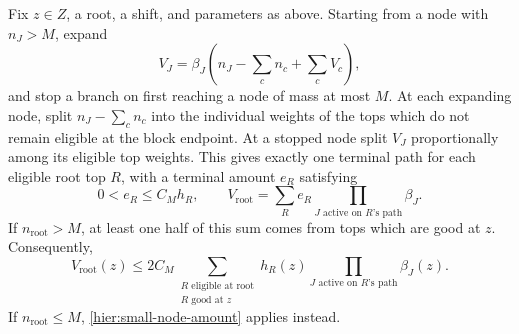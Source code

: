 \begin{lemma}
\label{hier:path-expansion}
Fix $z\in Z$, a root, a shift, and parameters as above.  Starting
from a node with $n_J>M$, expand
\begin{equation}
 V_J=\beta_J
      \left(n_J-\sum_c n_c+\sum_c V_c\right),
 \label{hier:exact-expansion}
\end{equation}
and stop a branch on first reaching a node of mass at most $M$.
At each expanding node, split $n_J-\sum_c n_c$ into the individual
weights of the tops which do not remain eligible at the block endpoint.
At a stopped node split $V_J$ proportionally among its eligible top
weights.  This gives exactly one terminal path for each eligible root
top $R$, with a terminal amount $e_R$ satisfying
\begin{equation}
 0<e_R\le C_Mh_R,
 \qquad
 V_{\mathrm{root}}
 =\sum_R e_R\prod_{J\text{ active on }R\text{'s path}}\beta_J.
 \label{hier:top-path-expansion}
\end{equation}
If $n_{\mathrm{root}}>M$, at least one half of this sum comes from tops
which are good at $z$.  Consequently,
\begin{equation}
 V_{\mathrm{root}}(z)
 \le 2C_M\sum_{\substack{R\text{ eligible at root}\\R\text{ good at }z}}
     h_R(z)\prod_{J\text{ active on }R\text{'s path}}\beta_J(z).
 \label{hier:good-path-domination}
\end{equation}
If $n_{\mathrm{root}}\le M$, \eqref{hier:small-node-amount} applies
instead.
\end{lemma}


